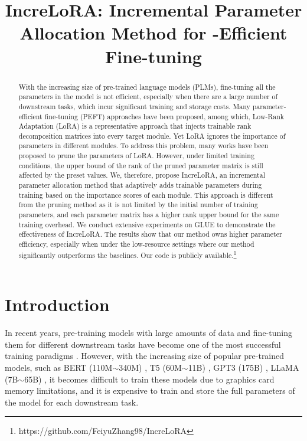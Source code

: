 \title{IncreLoRA: Incremental Parameter Allocation Method for -Efficient Fine-tuning}

\begin{abstract}
With the increasing size of pre-trained language models (PLMs), fine-tuning all the parameters in the model is not efficient, especially when there are a large number of downstream tasks, which incur significant training and storage costs. Many parameter-efficient fine-tuning (PEFT) approaches have been proposed, among which, Low-Rank Adaptation (LoRA) is a representative approach that injects trainable rank decomposition matrices into every target module. Yet LoRA ignores the importance of parameters in different modules. To address this problem, many works have been proposed to prune the  parameters of LoRA. However, under limited training conditions, the upper bound of the rank of the pruned parameter matrix is still affected by the preset values. We, therefore, propose IncreLoRA, an incremental parameter allocation method that adaptively adds trainable parameters during training based on the importance scores of each module. This approach is different from the pruning method as it is not limited by the initial number of training parameters, and each parameter matrix has a higher rank upper bound for the same training overhead. We conduct extensive experiments on GLUE to demonstrate the effectiveness of IncreLoRA. The results show that our method owns higher parameter efficiency, especially when under the low-resource settings where our method significantly outperforms the baselines. Our code is publicly available.\footnote{https://github.com/FeiyuZhang98/IncreLoRA}
\end{abstract}

\section{Introduction}

In recent years, pre-training models with large amounts of data and fine-tuning them for different downstream tasks have become one of the most successful training paradigms \cite{plm:1,plm:2,plm:3,plm:4,plm:5,plm:6}. However, with the increasing size of popular pre-trained models, such as BERT (110M$\sim$340M) \cite{plm:2}, T5 (60M$\sim$11B) \cite{plm:6} , GPT3 (175B) \cite{plm:7}, LLaMA (7B$\sim$65B) \cite{plm:8}, it becomes difficult to train these models due to graphics card memory limitations, and it is expensive to train and store the full parameters of the model for each downstream task. 

